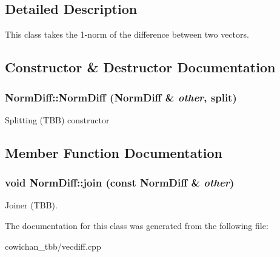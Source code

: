 \subsection{Detailed Description}
This class takes the 1-norm of the difference between two vectors. 

\subsection{Constructor \& Destructor Documentation}
\hypertarget{class_norm_diff_edef38012c44577650ccb47a55177eee}{
\subsubsection[{NormDiff}]{\setlength{\rightskip}{0pt plus 5cm}NormDiff::NormDiff ({\bf NormDiff} \& {\em other}, \/  split)}}
\label{class_norm_diff_edef38012c44577650ccb47a55177eee}


Splitting (TBB) constructor 

\subsection{Member Function Documentation}
\hypertarget{class_norm_diff_8a3ce83486dfa068fbc4d3601a6442b1}{
\subsubsection[{join}]{\setlength{\rightskip}{0pt plus 5cm}void NormDiff::join (const {\bf NormDiff} \& {\em other})}}
\label{class_norm_diff_8a3ce83486dfa068fbc4d3601a6442b1}


Joiner (TBB). 

The documentation for this class was generated from the following file:\begin{CompactItemize}
\item 
cowichan\_\-tbb/vecdiff.cpp\end{CompactItemize}
